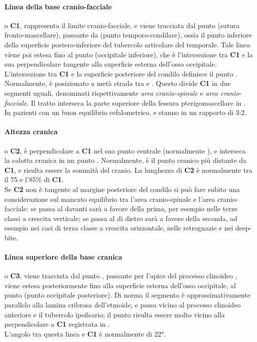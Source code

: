 \paragraph{Linea della base cranio-facciale} o \textbf{C1}, rappresenta il limite cranio-facciale, e viene tracciata dal punto  (sutura fronto-mascellare), passante da  (punto temporo-condilare), ossia il punto inferiore della superficie postero-inferiore del tubercolo articolare del temporale. Tale linea viene poi estesa fino al punto  (occipitale inferiore), che è l'intersezione tra \textbf{C1} e la sua perpendicolare tangente alla superficie esterna dell'osso occipitale. \\ L'intersezione tra \textbf{C1} e la superficie posteriore del condilo definisce il punto . Normalmente,  è posizionato a metà strada tra  e . Questo divide \textbf{C1} in due segmenti uguali, denominati rispettivamente \emph{area cranio-spinale} e \emph{area cranio-facciale}. Il tratto  interseca la parte superiore della fessura pterigomascellare in . In pazienti con un buon equilibrio cefalometrico,  e  stanno in un rapporto di 3:2.

\paragraph{Altezza cranica} o \textbf{C2}, è perpendicolare a \textbf{C1} nel suo punto centrale (normalmente ), e interseca la calotta cranica in un punto . Normalmente,  è il punto cranico più distante da \textbf{C1}, e  risulta essere la sommità del cranio. La lunghezza di \textbf{C2} è normalmente tra il 75 e l'85\% di \textbf{C1}. \\ Se \textbf{C2} non è tangente al margine posteriore del condilo si può fare subito una considerazione sul mancato equilibrio tra l'area cranio-spinale e l'area cranio-facciale: se passa al davanti sarà a favore della prima, per esempio nelle terze classi a crescita verticale; se passa al di dietro sarà a favore della seconda, ad esempio nei casi di terza classe a crescita orizzontale, nelle retrognazie e nei deep-bite.

\paragraph{Linea superiore della base cranica} o \textbf{C3}, viene tracciata dal punto , passante per l'apice del processo clinoideo , viene estesa posteriormente fino alla superficie esterna dell'osso occipitale, al punto  (punto occipitale posteriore). Di norma il segmento  è approssimativamente parallelo alla lamina cribrosa dell'etmoide, e passa vicino al processo clinoideo anteriore e il tubercolo ipofisario; il punto  risulta essere molto vicino alla perpendicolare a \textbf{C1} registrata in .\\
L'angolo tra questa linea e \textbf{C1} è normalmente di 22°.

